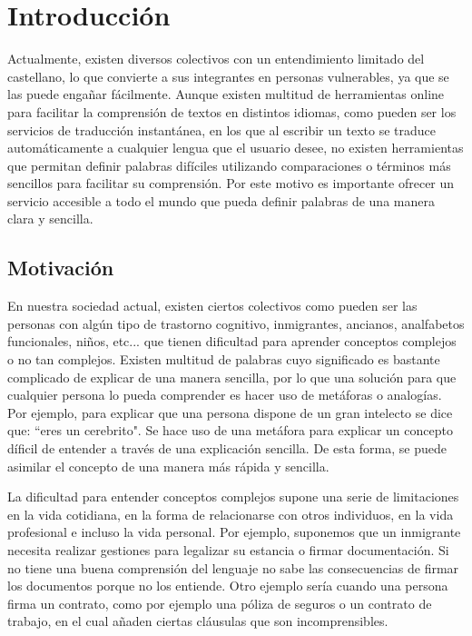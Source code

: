 \chapter{Introducción}
\label{cap:introduccion}

Actualmente, existen diversos colectivos con un entendimiento limitado del castellano, lo que convierte a sus integrantes en personas vulnerables, ya que se las puede engañar fácilmente. Aunque existen multitud de herramientas online para facilitar la comprensión de textos en distintos idiomas, como pueden ser los servicios de traducción instantánea, en los que al escribir un texto se traduce automáticamente a cualquier lengua que el usuario desee, no existen herramientas que permitan definir palabras difíciles utilizando comparaciones o términos más sencillos para facilitar su comprensión. 
Por este motivo es importante ofrecer un servicio accesible a todo el mundo que pueda definir palabras de una manera clara y sencilla.
 

	


\section{Motivación}
\label{cap:sec:motivacion}

En nuestra sociedad actual, existen ciertos colectivos como pueden ser las personas con algún tipo de trastorno cognitivo, inmigrantes, ancianos, analfabetos funcionales, niños, etc... que tienen dificultad para aprender conceptos complejos o no tan complejos. 
Existen multitud de palabras cuyo significado es bastante complicado de explicar de una manera sencilla, por lo que una solución para que cualquier persona lo pueda comprender es hacer uso de metáforas o analogías.  Por ejemplo, para explicar que una persona dispone de un gran intelecto se dice que: ``eres un cerebrito". Se hace uso de una metáfora para explicar un concepto díficil de entender a través de una explicación sencilla. De esta forma, se puede asimilar el concepto de una manera más rápida y sencilla.

La dificultad para entender conceptos complejos supone una serie de limitaciones en la vida cotidiana, en la forma de relacionarse con otros individuos, en la vida profesional e incluso la vida personal. Por ejemplo, suponemos que un inmigrante necesita realizar gestiones para legalizar su estancia o firmar documentación. Si no tiene una buena comprensión del lenguaje no sabe las consecuencias de firmar los documentos porque no los entiende. 
Otro ejemplo sería cuando una persona firma un contrato, como por ejemplo una póliza de seguros o un contrato de trabajo, en el cual añaden ciertas cláusulas que son incomprensibles. 


